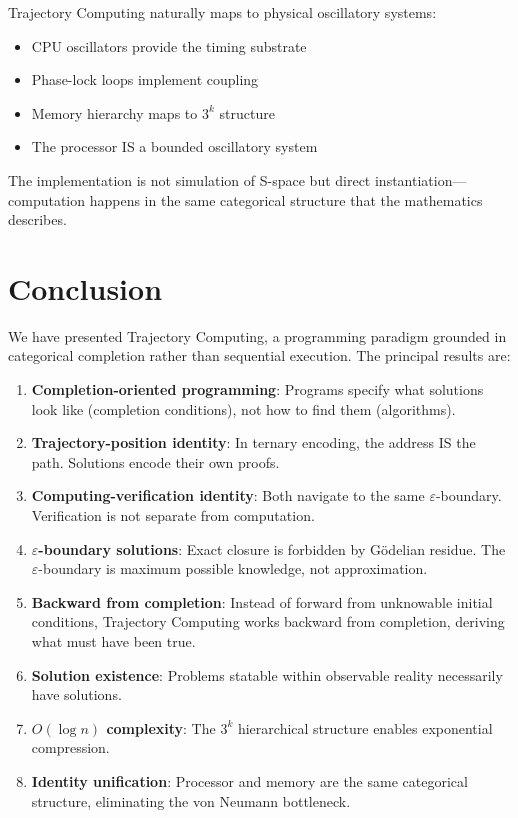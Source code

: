 \documentclass[twocolumn,10pt]{article}
\theoremstyle{remark}
\newcommand{\eps}{\varepsilon}
\begin{document}
Trajectory Computing naturally maps to physical oscillatory systems:

\begin{itemize}
    \item CPU oscillators provide the timing substrate
    \item Phase-lock loops implement coupling
    \item Memory hierarchy maps to $3^k$ structure
    \item The processor IS a bounded oscillatory system
\end{itemize}

The implementation is not simulation of S-space but direct instantiation---computation happens in the same categorical structure that the mathematics describes.

\section{Conclusion}
\label{sec:conclusion}

We have presented Trajectory Computing, a programming paradigm grounded in categorical completion rather than sequential execution. The principal results are:

\begin{enumerate}
    \item \textbf{Completion-oriented programming}: Programs specify what solutions look like (completion conditions), not how to find them (algorithms).

    \item \textbf{Trajectory-position identity}: In ternary encoding, the address IS the path. Solutions encode their own proofs.

    \item \textbf{Computing-verification identity}: Both navigate to the same $\eps$-boundary. Verification is not separate from computation.

    \item \textbf{$\eps$-boundary solutions}: Exact closure is forbidden by Gödelian residue. The $\eps$-boundary is maximum possible knowledge, not approximation.

    \item \textbf{Backward from completion}: Instead of forward from unknowable initial conditions, Trajectory Computing works backward from completion, deriving what must have been true.

    \item \textbf{Solution existence}: Problems statable within observable reality necessarily have solutions.

    \item \textbf{$O(\log n)$ complexity}: The $3^k$ hierarchical structure enables exponential compression.

    \item \textbf{Identity unification}: Processor and memory are the same categorical structure, eliminating the von Neumann bottleneck.
\end{enumerate}
\end{document}
